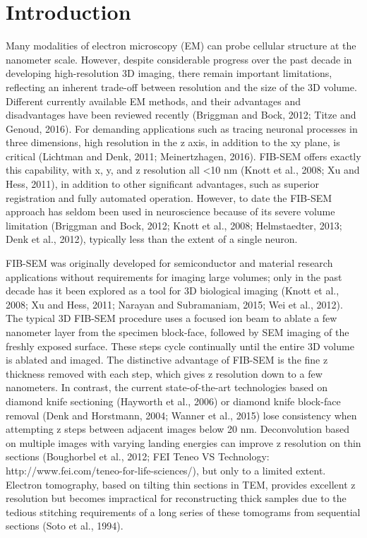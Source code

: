 \documentclass{article}
\begin{document}
\section*{Introduction}

Many modalities of electron microscopy (EM) can probe cellular structure at the nanometer scale. However, despite considerable progress over the past decade in developing high-resolution 3D imaging, there remain important limitations, reflecting an inherent trade-off between resolution and the size of the 3D volume. Different currently available EM methods, and their advantages and disadvantages have been reviewed recently (Briggman and Bock, 2012; Titze and Genoud, 2016). For demanding applications such as tracing neuronal processes in three dimensions, high resolution in the z axis, in addition to the xy plane, is critical (Lichtman and Denk, 2011; Meinertzhagen, 2016). FIB-SEM offers exactly this capability, with x, y, and z resolution all <10 nm (Knott et al., 2008; Xu and Hess, 2011), in addition to other significant advantages, such as superior registration and fully automated operation. However, to date the FIB-SEM approach has seldom been used in neuroscience because of its severe volume limitation (Briggman and Bock, 2012; Knott et al., 2008; Helmstaedter, 2013; Denk et al., 2012), typically less than the extent of a single neuron.

FIB-SEM was originally developed for semiconductor and material research applications without requirements for imaging large volumes; only in the past decade has it been explored as a tool for 3D biological imaging (Knott et al., 2008; Xu and Hess, 2011; Narayan and Subramaniam, 2015; Wei et al., 2012). The typical 3D FIB-SEM procedure uses a focused ion beam to ablate a few nanometer layer from the specimen block-face, followed by SEM imaging of the freshly exposed surface. These steps cycle continually until the entire 3D volume is ablated and imaged. The distinctive advantage of FIB-SEM is the fine z thickness removed with each step, which gives z resolution down to a few nanometers. In contrast, the current state-of-the-art technologies based on diamond knife sectioning (Hayworth et al., 2006) or diamond knife block-face removal (Denk and Horstmann, 2004; Wanner et al., 2015) lose consistency when attempting z steps between adjacent images below 20 nm. Deconvolution based on multiple images with varying landing energies can improve z resolution on thin sections (Boughorbel et al., 2012; FEI Teneo VS Technology: http://www.fei.com/teneo-for-life-sciences/), but only to a limited extent. Electron tomography, based on tilting thin sections in TEM, provides excellent z resolution but becomes impractical for reconstructing thick samples due to the tedious stitching requirements of a long series of these tomograms from sequential sections (Soto et al., 1994).
\end{document}
